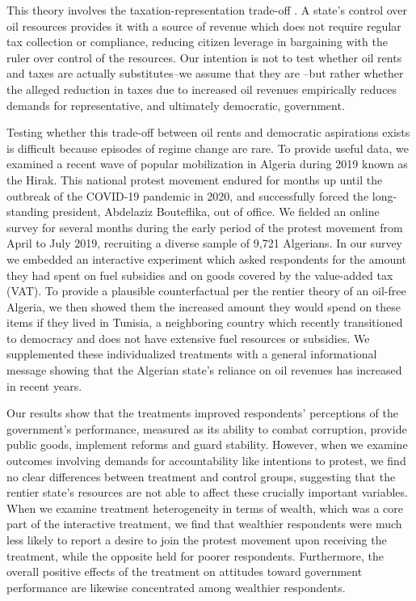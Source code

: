 \documentclass[12pt, letterpaper]{article}
\begin{document}
This theory involves the taxation-representation trade-off \parencite{levi_rule_1989,tilly_coercion_1992, prichard_taxation_2015}. A state's control over oil resources provides it with a source of revenue which does not require regular tax collection or compliance, reducing citizen leverage in bargaining with the ruler over control of the resources. Our intention is not to test whether oil rents and taxes are actually substitutes--we assume  that they are --but rather whether the alleged reduction in taxes due to increased oil revenues empirically reduces demands for representative, and ultimately democratic, government.

Testing whether this trade-off between oil rents and democratic aspirations exists is difficult because episodes of regime change are  rare. To provide useful data, we examined a recent wave of popular mobilization in Algeria during 2019 known as the Hirak. This national protest movement endured for months up until the outbreak of the COVID-19 pandemic in 2020, and successfully forced the long-standing president, Abdelaziz Bouteflika, out of office. We fielded an online survey for several months during the early period of the protest movement from April to July 2019, recruiting a diverse sample of 9,721 Algerians. In our survey we embedded an interactive experiment which asked respondents for the amount they had spent on fuel subsidies and on goods covered by the value-added tax (VAT). To provide a plausible counterfactual per the rentier theory of an oil-free Algeria, we then showed them the increased amount they would spend on these items if they lived in Tunisia, a neighboring country which recently transitioned to democracy and does not have extensive fuel resources or subsidies. We supplemented these individualized treatments with a general informational message showing that the Algerian state's reliance on oil revenues has increased in recent years.

Our results show that the treatments improved respondents' perceptions of the government's performance, measured as its ability to combat corruption, provide public goods, implement reforms and guard stability. However, when we examine outcomes involving demands for accountability like intentions to protest, we find no clear differences between treatment and control groups, suggesting that the rentier state's resources are not able to affect these crucially important variables. When we examine treatment heterogeneity in terms of wealth, which was a core part of the interactive treatment, we find that wealthier respondents were much less likely to report a desire to join the protest movement upon receiving the treatment, while the opposite held for poorer respondents. Furthermore, the overall positive effects of the treatment on attitudes toward government performance are likewise concentrated among wealthier respondents. 
\end{document}

